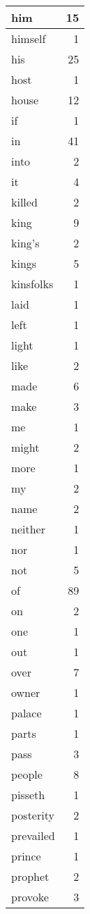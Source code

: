 \begin{center}
\begin{longtable}{l|r}
him & 15\\ \hline 
himself & 1\\ \hline 
his & 25\\ \hline 
host & 1\\ \hline 
house & 12\\ \hline 
if & 1\\ \hline 
in & 41\\ \hline 
into & 2\\ \hline 
it & 4\\ \hline 
killed & 2\\ \hline 
king & 9\\ \hline 
king's & 2\\ \hline 
kings & 5\\ \hline 
kinsfolks & 1\\ \hline 
laid & 1\\ \hline 
left & 1\\ \hline 
light & 1\\ \hline 
like & 2\\ \hline 
made & 6\\ \hline 
make & 3\\ \hline 
me & 1\\ \hline 
might & 2\\ \hline 
more & 1\\ \hline 
my & 2\\ \hline 
name & 2\\ \hline 
neither & 1\\ \hline 
nor & 1\\ \hline 
not & 5\\ \hline 
of & 89\\ \hline 
on & 2\\ \hline 
one & 1\\ \hline 
out & 1\\ \hline 
over & 7\\ \hline 
owner & 1\\ \hline 
palace & 1\\ \hline 
parts & 1\\ \hline 
pass & 3\\ \hline 
people & 8\\ \hline 
pisseth & 1\\ \hline 
posterity & 2\\ \hline 
prevailed & 1\\ \hline 
prince & 1\\ \hline 
prophet & 2\\ \hline 
provoke & 3\\ \hline 

\end{longtable}
\end{center}
